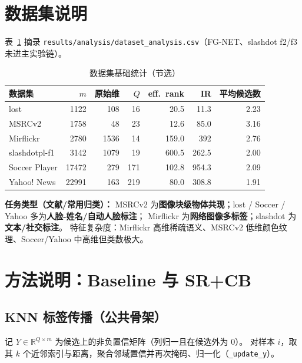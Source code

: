 \documentclass[11pt,a4paper]{article}
\begin{document}
\section{数据集说明}

表~\ref{tab:dataset-stats} 摘录 \texttt{results/analysis/dataset\_analysis.csv}（FG-NET、slashdot f2/f3 未进主实验链）。

\begin{table}[htbp]
\centering
\caption{数据集基础统计（节选）}
\label{tab:dataset-stats}
\small
\begin{tabular}{lrrrrrr}
\toprule
数据集 & $m$ & 原始维 & $Q$ & eff.\ rank & IR\footnotemark & 平均候选数 \\
\midrule
lost & 1122 & 108 & 16 & 20.5 & 11.3 & 2.23 \\
MSRCv2 & 1758 & 48 & 23 & 12.6 & 85.0 & 3.16 \\
Mirflickr & 2780 & 1536 & 14 & 159.0 & 392 & 2.76 \\
slashdotpl-f1 & 3142 & 1079 & 19 & 600.5 & 262.5 & 2.00 \\
Soccer Player & 17472 & 279 & 171 & 102.8 & 954.3 & 2.09 \\
Yahoo! News & 22991 & 163 & 219 & 80.0 & 308.8 & 1.91 \\
\bottomrule
\end{tabular}
\end{table}

\noindent\textbf{任务类型（文献/常用归类）：}
MSRCv2 为\textbf{图像块级物体共现}；lost / Soccer / Yahoo 多为\textbf{人脸-姓名/自动人脸标注}；
Mirflickr 为\textbf{网络图像多标签}；slashdot 为\textbf{文本/社交标注}。
特征复杂度：Mirflickr 高维稀疏语义、MSRCv2 低维颜色纹理、Soccer/Yahoo 中高维但类数极大。

\section{方法说明：Baseline 与 SR+CB}

\subsection{KNN 标签传播（公共骨架）}
记 $Y \in \mathbb{R}^{Q \times m}$ 为候选上的非负置信矩阵（列归一且在候选外为 0）。
对样本 $i$，取其 $k$ 个近邻索引与距离，聚合邻域置信并再次掩码、归一化（\texttt{\_update\_y}）。
\end{document}
